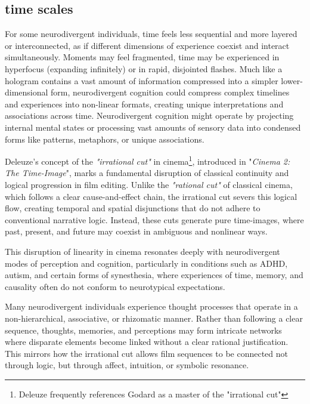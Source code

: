\subsection*{time scales}

For some neurodivergent individuals, time feels less sequential and more layered or interconnected, as if different dimensions of experience coexist and interact simultaneously. Moments may feel fragmented, time may be experienced in hyperfocus (expanding infinitely) or in rapid, disjointed flashes. Much like a hologram contains a vast amount of information compressed into a simpler lower-dimensional form, neurodivergent cognition could compress complex timelines and experiences into non-linear formats, creating unique interpretations and associations across time.
Neurodivergent cognition might operate by projecting internal mental states or processing vast amounts of sensory data into condensed forms like patterns, metaphors, or unique associations. 

Deleuze's concept of the \textit{"irrational cut"} in cinema\footnote{Deleuze frequently references Godard as a master of the "irrational cut"}, introduced in "\textit{Cinema 2: The Time-Image}"\citep{deleuze1985}, marks a fundamental disruption of classical continuity and logical progression in film editing. Unlike the \textit{"rational cut"} of classical cinema, which follows a clear cause-and-effect chain, the irrational cut severs this logical flow, creating temporal and spatial disjunctions that do not adhere to conventional narrative logic. Instead, these cuts generate pure time-images, where past, present, and future may coexist in ambiguous and nonlinear ways.

This disruption of linearity in cinema resonates deeply with neurodivergent modes of perception and cognition, particularly in conditions such as ADHD, autism, and certain forms of synesthesia, where experiences of time, memory, and causality often do not conform to neurotypical expectations.

Many neurodivergent individuals experience thought processes that operate in a non-hierarchical, associative, or rhizomatic manner. Rather than following a clear sequence, thoughts, memories, and perceptions may form intricate networks where disparate elements become linked without a clear rational justification. This mirrors how the irrational cut allows film sequences to be connected not through logic, but through affect, intuition, or symbolic resonance.
 
